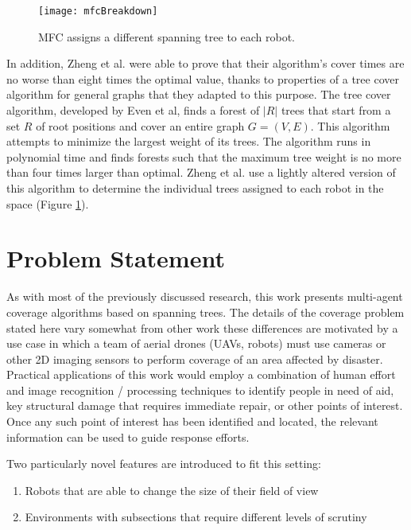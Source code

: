 \begin{figure}[H]
\texttt{[image: mfcBreakdown]}
\caption[Multi-Robot Forest Coverage Path Creation]{MFC assigns a different spanning tree to each robot.}
\label {fig:MRCPaths}
\end{figure}

In addition, Zheng et al. were able to prove that their algorithm's cover times are no worse than eight times the optimal value, thanks to properties of a tree cover algorithm for general graphs that they adapted to this purpose. The tree cover algorithm, developed by Even et al, finds a forest of $|R|$ trees that start from a set $R$ of root positions and cover an entire graph $G = (V, E)$. This algorithm attempts to minimize the largest weight of its trees. The algorithm runs in polynomial time and finds forests such that the maximum tree weight is no more than four times larger than optimal. Zheng et al. use a lightly altered version of this algorithm to determine the individual trees assigned to each robot in the space (Figure \ref{fig:MRCPaths}). 

\section{Problem Statement}

As with most of the previously discussed research, this work presents multi-agent coverage algorithms based on spanning trees. The details of the coverage problem stated here vary somewhat from other work \textemdash these differences are motivated by a use case in which a team of aerial drones (UAVs, robots) must use cameras or other 2D imaging sensors to perform coverage of an area affected by disaster. Practical applications of this work would employ a combination of human effort and image recognition / processing techniques to identify people in need of aid, key structural damage that requires immediate repair, or other points of interest. Once any such point of interest has been identified and located, the relevant information can be used to guide response efforts.

Two particularly novel features are introduced to fit this setting:
\begin{enumerate}
	\item Robots that are able to change the size of their field of view
	\item Environments with subsections that require different levels of scrutiny
\end{enumerate}

